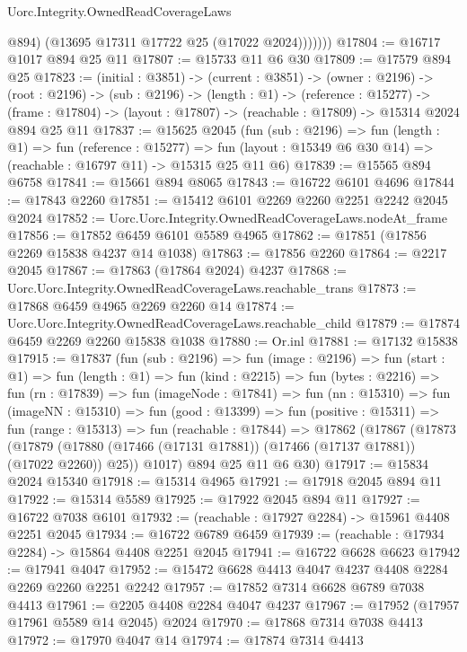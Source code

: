 \begin{lexlean}{Uorc.Integrity.OwnedReadCoverageLaws}
\begin{coremodule}
                @894)
              (@13695 @17311 @17722 @25 (@17022 @2024)))))))
@17804 := @16717 @1017 @894 @25 @11
@17807 := @15733 @11 @6 @30
@17809 := @17579 @894 @25
@17823 := (initial : @3851) ->
  (current : @3851) ->
  (owner : @2196) ->
  (root : @2196) ->
  (sub : @2196) ->
  (length : @1) ->
  (reference : @15277) ->
  (frame : @17804) -> (layout : @17807) -> (reachable : @17809) -> @15314 @2024 @894 @25 @11
@17837 := @15625
    @2045
    (fun (sub : @2196) =>
    fun (length : @1) =>
    fun (reference : @15277) =>
    fun (layout : @15349 @6 @30 @14) => (reachable : @16797 @11) -> @15315 @25 @11 @6)
@17839 := @15565 @894 @6758
@17841 := @15661 @894 @8065
@17843 := @16722 @6101 @4696
@17844 := @17843 @2260
@17851 := @15412 @6101 @2269 @2260 @2251 @2242 @2045 @2024
@17852 := Uorc.Uorc.Integrity.OwnedReadCoverageLaws.nodeAt_frame
@17856 := @17852 @6459 @6101 @5589 @4965
@17862 := @17851 (@17856 @2269 @15838 @4237 @14 @1038)
@17863 := @17856 @2260
@17864 := @2217 @2045
@17867 := @17863 (@17864 @2024) @4237
@17868 := Uorc.Uorc.Integrity.OwnedReadCoverageLaws.reachable_trans
@17873 := @17868 @6459 @4965 @2269 @2260 @14
@17874 := Uorc.Uorc.Integrity.OwnedReadCoverageLaws.reachable_child
@17879 := @17874 @6459 @2269 @2260 @15838 @1038
@17880 := Or.inl
@17881 := @17132 @15838
@17915 := @17837
    (fun (sub : @2196) =>
    fun (image : @2196) =>
    fun (start : @1) =>
    fun (length : @1) =>
    fun (kind : @2215) =>
    fun (bytes : @2216) =>
    fun (rn : @17839) =>
    fun (imageNode : @17841) =>
    fun (nn : @15310) =>
    fun (imageNN : @15310) =>
    fun (good : @13399) =>
    fun (positive : @15311) =>
    fun (range : @15313) =>
    fun (reachable : @17844) =>
    @17862
      (@17867
        (@17873
          (@17879 (@17880 (@17466 (@17131 @17881)) (@17466 (@17137 @17881)) (@17022 @2260)) @25))
        @1017)
      @894
      @25
      @11
      @6
      @30)
@17917 := @15834 @2024 @15340
@17918 := @15314 @4965
@17921 := @17918 @2045 @894 @11
@17922 := @15314 @5589
@17925 := @17922 @2045 @894 @11
@17927 := @16722 @7038 @6101
@17932 := (reachable : @17927 @2284) -> @15961 @4408 @2251 @2045
@17934 := @16722 @6789 @6459
@17939 := (reachable : @17934 @2284) -> @15864 @4408 @2251 @2045
@17941 := @16722 @6628 @6623
@17942 := @17941 @4047
@17952 := @15472 @6628 @4413 @4047 @4237 @4408 @2284 @2269 @2260 @2251 @2242
@17957 := @17852 @7314 @6628 @6789 @7038 @4413
@17961 := @2205 @4408 @2284 @4047 @4237
@17967 := @17952 (@17957 @17961 @5589 @14 @2045) @2024
@17970 := @17868 @7314 @7038 @4413
@17972 := @17970 @4047 @14
@17974 := @17874 @7314 @4413

\end{coremodule}
\end{lexlean}

